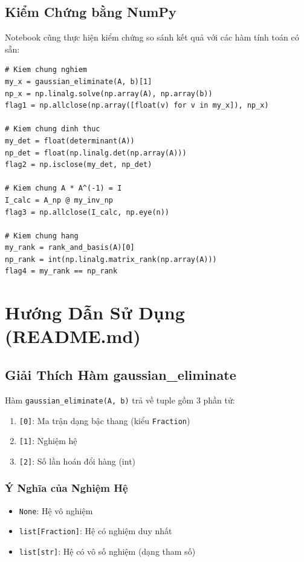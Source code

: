 \documentclass[12pt, a4paper, twoside]{article}
\begin{document}
\subsection{Kiểm Chứng bằng NumPy}

Notebook cũng thực hiện kiểm chứng so sánh kết quả với các hàm tính toán có sẵn:

\begin{lstlisting}
# Kiem chung nghiem
my_x = gaussian_eliminate(A, b)[1]
np_x = np.linalg.solve(np.array(A), np.array(b))
flag1 = np.allclose(np.array([float(v) for v in my_x]), np_x)

# Kiem chung dinh thuc
my_det = float(determinant(A))
np_det = float(np.linalg.det(np.array(A)))
flag2 = np.isclose(my_det, np_det)

# Kiem chung A * A^(-1) = I
I_calc = A_np @ my_inv_np
flag3 = np.allclose(I_calc, np.eye(n))

# Kiem chung hang
my_rank = rank_and_basis(A)[0]
np_rank = int(np.linalg.matrix_rank(np.array(A)))
flag4 = my_rank == np_rank
\end{lstlisting}

\newpage

\section{Hướng Dẫn Sử Dụng (README.md)}

\subsection{Giải Thích Hàm gaussian\_eliminate}

Hàm \texttt{gaussian\_eliminate(A, b)} trả về tuple gồm 3 phần tử:

\begin{enumerate}
    \item \texttt{[0]}: Ma trận dạng bậc thang (kiểu \texttt{Fraction})
    \item \texttt{[1]}: Nghiệm hệ
    \item \texttt{[2]}: Số lần hoán đổi hàng (int)
\end{enumerate}

\subsubsection{Ý Nghĩa của Nghiệm Hệ}

\begin{itemize}
    \item \texttt{None}: Hệ vô nghiệm
    \item \texttt{list[Fraction]}: Hệ có nghiệm duy nhất
    \item \texttt{list[str]}: Hệ có vô số nghiệm (dạng tham số)
\end{itemize}
\end{document}
